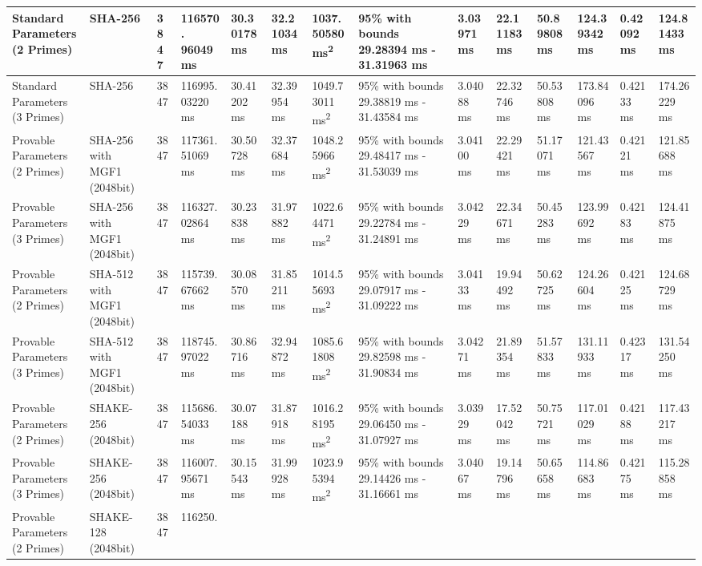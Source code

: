 \documentclass[]{final_report}
\theoremstyle{definition}
\begin{document}
\begin{landscape}
\begin{longtable}{|p{2.3cm}|p{1.8cm}|p{1.0cm}|p{1.7cm}|p{1.2cm}|p{1.5cm}|p{1.8cm}|p{1.5cm}|p{1.2cm}|p{1.5cm}|p{1.3cm}|p{1.4cm}|p{1.3cm}|p{1.5cm}|}
Standard Parameters (2 Primes) & SHA-256 & 3847 & 116570.
96049 ms & 30.30178 ms & 32.21034 ms & 1037.50580 ms\textsuperscript{2} & 95\% with bounds 29.28394 ms - 31.31963 ms & 3.03971 ms & 22.11183 ms & 50.89808 ms & 124.39342 ms & 0.42092 ms & 124.81433 ms \\
\hline
Standard Parameters (3 Primes) & SHA-256 & 3847 & 116995.
03220 ms & 30.41202 ms & 32.39954 ms & 1049.73011 ms\textsuperscript{2} & 95\% with bounds 29.38819 ms - 31.43584 ms & 3.04088 ms & 22.32746 ms & 50.53808 ms & 173.84096 ms & 0.42133 ms & 174.26229 ms \\
\hline
Provable Parameters (2 Primes) & SHA-256 with MGF1 (2048bit) & 3847 & 117361.
51069 ms & 30.50728 ms & 32.37684 ms & 1048.25966 ms\textsuperscript{2} & 95\% with bounds 29.48417 ms - 31.53039 ms & 3.04100 ms & 22.29421 ms & 51.17071 ms & 121.43567 ms & 0.42121 ms & 121.85688 ms \\
\hline
Provable Parameters (3 Primes) & SHA-256 with MGF1 (2048bit) & 3847 & 116327.
02864 ms & 30.23838 ms & 31.97882 ms & 1022.64471 ms\textsuperscript{2} & 95\% with bounds 29.22784 ms - 31.24891 ms & 3.04229 ms & 22.34671 ms & 50.45283 ms & 123.99692 ms & 0.42183 ms & 124.41875 ms \\
\hline
Provable Parameters (2 Primes) & SHA-512 with MGF1 (2048bit) & 3847 & 115739.
67662 ms & 30.08570 ms & 31.85211 ms & 1014.55693 ms\textsuperscript{2} & 95\% with bounds 29.07917 ms - 31.09222 ms & 3.04133 ms & 19.94492 ms & 50.62725 ms & 124.26604 ms & 0.42125 ms & 124.68729 ms \\
\hline
Provable Parameters (3 Primes) & SHA-512 with MGF1 (2048bit) & 3847 & 118745.
97022 ms & 30.86716 ms & 32.94872 ms & 1085.61808 ms\textsuperscript{2} & 95\% with bounds 29.82598 ms - 31.90834 ms & 3.04271 ms & 21.89354 ms & 51.57833 ms & 131.11933 ms & 0.42317 ms & 131.54250 ms \\
\hline
Provable Parameters (2 Primes) & SHAKE-256 (2048bit) & 3847 & 115686.
54033 ms & 30.07188 ms & 31.87918 ms & 1016.28195 ms\textsuperscript{2} & 95\% with bounds 29.06450 ms - 31.07927 ms & 3.03929 ms & 17.52042 ms & 50.75721 ms & 117.01029 ms & 0.42188 ms & 117.43217 ms \\
\hline
Provable Parameters (3 Primes) & SHAKE-256 (2048bit) & 3847 & 116007.
95671 ms & 30.15543 ms & 31.99928 ms & 1023.95394 ms\textsuperscript{2} & 95\% with bounds 29.14426 ms - 31.16661 ms & 3.04067 ms & 19.14796 ms & 50.65658 ms & 114.86683 ms & 0.42175 ms & 115.28858 ms \\
\hline
Provable Parameters (2 Primes) & SHAKE-128 (2048bit) & 3847 & 116250.

\end{longtable}
\end{landscape}
\end{document}
